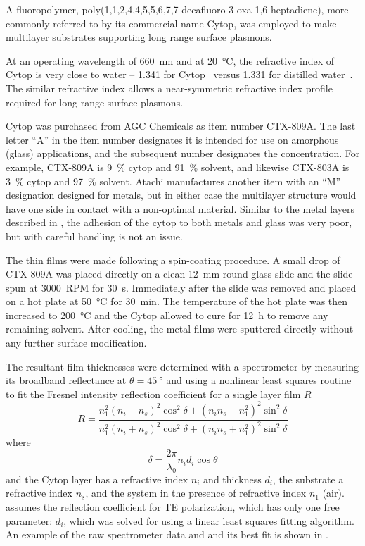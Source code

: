 A fluoropolymer, poly(1,1,2,4,4,5,5,6,7,7-decafluoro-3-oxa-1,6-heptadiene),
more commonly referred to by its commercial name Cytop, was employed to
make multilayer substrates supporting long range surface plasmons.

At an operating wavelength of \SI{660}{\nano\meter} and at
\SI{20}{\celsius}, the refractive index of Cytop is very close to water --
1.341 for Cytop~\cite{mikevs2005synthesis} versus 1.331 for distilled
water~\cite{andreasson1971measurement}.  The similar refractive index
allows a near-symmetric refractive index profile required for long range
surface plasmons.

Cytop was purchased from AGC Chemicals as item number CTX-809A.  The last
letter ``A'' in the item number designates it is intended for use on
amorphous (glass) applications, and the subsequent number designates the
concentration.  For example, CTX-809A is \SI{9}{\percent} cytop and
\SI{91}{\percent} solvent, and likewise CTX-803A is \SI{3}{\percent} cytop
and \SI{97}{\percent} solvent.  Atachi manufactures another item with an
``M'' designation designed for metals, but in either case the multilayer
structure would have one side in contact with a non-optimal material.
Similar to the metal layers described in , the
adhesion of the cytop to both metals and glass was very poor, but with
careful handling is not an issue.

The thin films were made following a spin-coating procedure.  A small drop
of CTX-809A was placed directly on a clean \SI{12}{\milli\meter} round
glass slide and the slide spun at \SI{3000}{RPM} for \SI{30}{\second}.
Immediately after the slide was removed and placed on a hot plate at
\SI{50}{\celsius} for \SI{30}{\minute}.  The temperature of the hot plate
was then increased to \SI{200}{\celsius} and the Cytop allowed to cure for
\SI{12}{\hour} to remove any remaining solvent.  After cooling, the metal
films were sputtered directly without any further surface modification.

The resultant film thicknesses were determined with a spectrometer by
measuring its broadband reflectance at $\theta=\SI{45}{\degree}$ and using
a nonlinear least squares routine~\cite{more1977LevAlgImpThe_2} to 
fit the Fresnel intensity reflection coefficient for a single layer
film $R$~\cite{steck2006classical} 
\begin{equation}
 R = \frac{n_1^2(n_i-n_s)^2 \cos^2\delta + (n_i n_s - n_1^2)^2\sin^2\delta}
          {n_1^2(n_i+n_s)^2 \cos^2\delta + (n_i n_s + n_1^2)^2\sin^2\delta}
          \label{eqn:fitfresnel}
\end{equation}
where
\begin{equation}
 \delta = \frac{2\pi}{\lambda_0} n_i d_i \cos \theta
\end{equation}
and the Cytop layer has a refractive index $n_i$ and thickness $d_i$, the
substrate a refractive index $n_s$, and the system in the presence of
refractive index $n_1$ (air).   assumes the
reflection coefficient for TE polarization, which 
 has only one free parameter: $d_i$, which was
solved for using a linear least squares fitting algorithm.
An example of the raw spectrometer data and and its best fit is shown in
.

